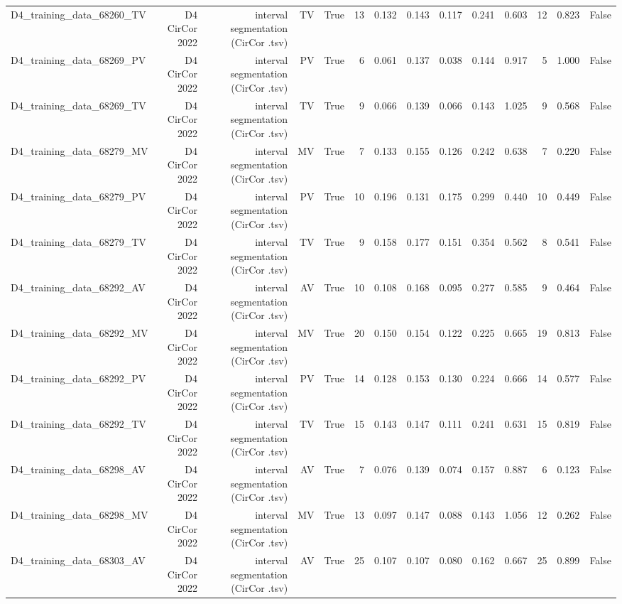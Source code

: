 \begin{table}[htbp]
\begin{tabular}{lrrrrrrrrrrrrr}
    D4\_training\_data\_68260\_TV & D4 CirCor 2022 & interval segmentation (CirCor .tsv) & TV & True & 13 & 0.132 & 0.143 & 0.117 & 0.241 & 0.603 & 12 & 0.823 & False \\
    D4\_training\_data\_68269\_PV & D4 CirCor 2022 & interval segmentation (CirCor .tsv) & PV & True & 6 & 0.061 & 0.137 & 0.038 & 0.144 & 0.917 & 5 & 1.000 & False \\
    D4\_training\_data\_68269\_TV & D4 CirCor 2022 & interval segmentation (CirCor .tsv) & TV & True & 9 & 0.066 & 0.139 & 0.066 & 0.143 & 1.025 & 9 & 0.568 & False \\
    D4\_training\_data\_68279\_MV & D4 CirCor 2022 & interval segmentation (CirCor .tsv) & MV & True & 7 & 0.133 & 0.155 & 0.126 & 0.242 & 0.638 & 7 & 0.220 & False \\
    D4\_training\_data\_68279\_PV & D4 CirCor 2022 & interval segmentation (CirCor .tsv) & PV & True & 10 & 0.196 & 0.131 & 0.175 & 0.299 & 0.440 & 10 & 0.449 & False \\
    D4\_training\_data\_68279\_TV & D4 CirCor 2022 & interval segmentation (CirCor .tsv) & TV & True & 9 & 0.158 & 0.177 & 0.151 & 0.354 & 0.562 & 8 & 0.541 & False \\
    D4\_training\_data\_68292\_AV & D4 CirCor 2022 & interval segmentation (CirCor .tsv) & AV & True & 10 & 0.108 & 0.168 & 0.095 & 0.277 & 0.585 & 9 & 0.464 & False \\
    D4\_training\_data\_68292\_MV & D4 CirCor 2022 & interval segmentation (CirCor .tsv) & MV & True & 20 & 0.150 & 0.154 & 0.122 & 0.225 & 0.665 & 19 & 0.813 & False \\
    D4\_training\_data\_68292\_PV & D4 CirCor 2022 & interval segmentation (CirCor .tsv) & PV & True & 14 & 0.128 & 0.153 & 0.130 & 0.224 & 0.666 & 14 & 0.577 & False \\
    D4\_training\_data\_68292\_TV & D4 CirCor 2022 & interval segmentation (CirCor .tsv) & TV & True & 15 & 0.143 & 0.147 & 0.111 & 0.241 & 0.631 & 15 & 0.819 & False \\
    D4\_training\_data\_68298\_AV & D4 CirCor 2022 & interval segmentation (CirCor .tsv) & AV & True & 7 & 0.076 & 0.139 & 0.074 & 0.157 & 0.887 & 6 & 0.123 & False \\
    D4\_training\_data\_68298\_MV & D4 CirCor 2022 & interval segmentation (CirCor .tsv) & MV & True & 13 & 0.097 & 0.147 & 0.088 & 0.143 & 1.056 & 12 & 0.262 & False \\
    D4\_training\_data\_68303\_AV & D4 CirCor 2022 & interval segmentation (CirCor .tsv) & AV & True & 25 & 0.107 & 0.107 & 0.080 & 0.162 & 0.667 & 25 & 0.899 & False \\

\end{tabular}
\end{table}
